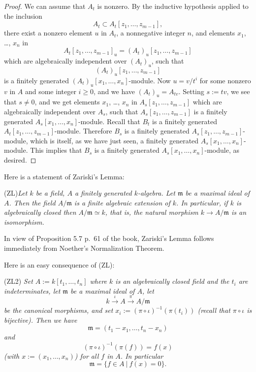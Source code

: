 \documentclass[parskip=half]{scrartcl}%
\newcommand{\mf}{\mathfrak}
\begin{document}
\begin{proof}
We can assume that $A_t$ is nonzero. By the inductive hypothesis applied to the inclusion 
$$
A_t\subset A_t[z_1,\dots,z_{m-1}],
$$ 
there exist a nonzero element $u$ in $A_t$, a nonnegative integer $n$, and elements $x_1$, \dots, $x_n$ in 
$$
A_t[z_1,\dots,z_{m-1}]_u=(A_t)_u[z_1,\dots,z_{m-1}]
$$ 
which are algebraically independent over $(A_t)_u$, such that 
$$
(A_t)_u[z_1,\dots,z_{m-1}]
$$ 
is a finitely generated $(A_t)_u[x_1,\dots,x_n]$-module. Now $u=v/t^i$ for some nonzero $v$ in $A$ and some integer $i\ge0$, and we have $(A_t)_u=A_{tv}$. Setting $s:=tv$, we see that $s\ne0$, and we get elements $x_1$, \dots, $x_n$ in 
$
A_s[z_1,\dots,z_{m-1}]
$ 
which are algebraically independent over $A_s$, such that 
$
A_s[z_1,\dots,z_{m-1}]
$ 
is a finitely generated $A_s[x_1,\dots,x_n]$-module. Recall that $B_t$ is a finitely generated $A_t[z_1,\dots,z_{m-1}]$-module. Therefore $B_s$ is a finitely generated $A_s[z_1,\dots,z_{m-1}]$-module, which is itself, as we have just seen, a finitely generated $A_s[x_1,\dots,x_n]$-module. This implies that $B_s$ is a finitely generated $A_s[x_1,\dots,x_n]$-module,  as desired.
\end{proof} 

Here is a statement of Zariski's Lemma:

(ZL)\emph{Let $k$ be a field, $A$ a finitely generated $k$-algebra. Let $\mf m$ be a maximal ideal of $A$. Then the field $A/\mf m$ is a finite algebraic extension of $k$. In particular, if $k$ is algebraically closed then $A/\mf m\simeq k$, that is, the natural morphism $k\to A/\mf m$ is an isomorphism.}

In view of Proposition 5.7 p.~61 of the book, Zariski's Lemma follows immediately from Noether's Normalization Theorem. %

Here is an easy consequence of (ZL):

(ZL2) \emph{Set $A:=k[t_1,\dots,t_n]$ where $k$ is an algebraically closed field and the $t_i$ are indeterminates, let $\mf m$ be a maximal ideal of $A$, let} 
$$
k\xrightarrow\iota A\xrightarrow{\pi}A/\mf m
$$ 
\emph{be the canonical morphisms, and set $x_i:=(\pi\circ\iota)^{-1}(\pi(t_i))$ (recall that $\pi\circ\iota$ is bijective). Then we have} 
$$
\mf m=(t_1-x_1,\dots,t_n-x_n)
$$ 
\emph{and} 
$$
(\pi\circ\iota)^{-1}(\pi(f))=f(x)
$$ 
\emph{(with $x:=(x_1,\dots,x_n)$) for all $f$ in $A$. In particular} 
$$
\mf m=\{f\in A\ |\ f(x)=0\}.
$$
\end{document}
